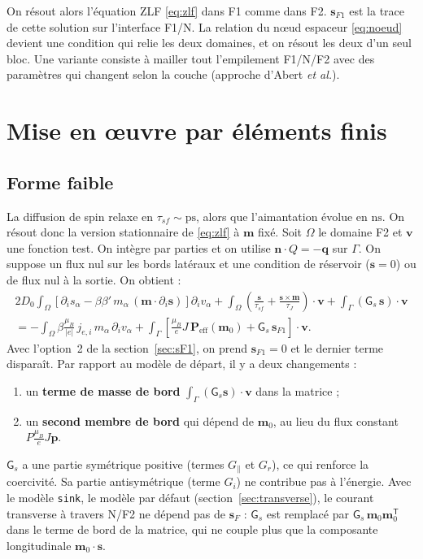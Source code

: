 \documentclass[11pt,a4paper]{article}
\newcommand{\vm}{\bm{m}}
\newcommand{\vp}{\bm{p}}
\newcommand{\vs}{\bm{s}}
\newcommand{\vv}{\bm{v}}
\newcommand{\vq}{\bm{q}}
\newcommand{\mG}{\mathsf{G}}
\begin{document}
On résout alors l'équation ZLF \eqref{eq:zlf} dans F1 comme dans F2.
$\vs_{F1}$ est la trace de cette solution sur l'interface F1/N. La relation
du nœud espaceur \eqref{eq:noeud} devient une condition qui relie les deux
domaines, et on résout les deux d'un seul bloc. Une variante consiste à
mailler tout l'empilement F1/N/F2 avec des paramètres qui changent selon la
couche (approche d'Abert \emph{et al.}).

\section{Mise en œuvre par éléments finis}

\subsection{Forme faible}

La diffusion de spin relaxe en $\tau_{sf}\sim\mathrm{ps}$, alors que
l'aimantation évolue en $\mathrm{ns}$. On résout donc la version
stationnaire de \eqref{eq:zlf} à $\vm$ fixé. Soit $\Omega$ le domaine F2
et $\vv$ une fonction test. On intègre par parties et on utilise
$\bm{n}\cdot Q = -\vq$ sur $\Gamma$. On suppose un flux nul sur
les bords latéraux et une condition de réservoir ($\vs=0$) ou de flux nul
à la sortie. On obtient :
\begin{multline}
  2D_0\int_\Omega\left[\partial_i s_\alpha
    - \beta\beta'\,m_\alpha\,(\vm\cdot\partial_i\vs)\right]\partial_i v_\alpha
  + \int_\Omega\left(\frac{\vs}{\tau_{sf}}
    + \frac{\vs\times\vm}{\tau_J}\right)\cdot\vv
  + \int_\Gamma\left(\mG_s\,\vs\right)\cdot\vv
  \\
  = -\int_\Omega\beta\frac{\mu_B}{|e|}\,j_{e,i}\,m_\alpha\,\partial_i v_\alpha
  + \int_\Gamma\left[\frac{\mu_B}{e}J\,\bm{P}_{\!\mathrm{eff}}(\vm_0)
    + \mG_s\,\vs_{F1}\right]\cdot\vv.
  \label{eq:faible}
\end{multline}
Avec l'option~2 de la section~\ref{sec:sF1}, on prend $\vs_{F1}=0$ et
le dernier terme disparaît. Par rapport au modèle de départ, il y a deux
changements :
\begin{enumerate}
  \item un \textbf{terme de masse de bord}
    $\int_\Gamma(\mG_s\vs)\cdot\vv$ dans la matrice ;
  \item un \textbf{second membre de bord} qui dépend de $\vm_0$, au lieu
    du flux constant $P\frac{\mu_B}{e}J\vp$.
\end{enumerate}
$\mG_s$ a une partie symétrique positive (termes $G_\parallel$ et $G_r$),
ce qui renforce la coercivité. Sa partie antisymétrique (terme $G_i$) ne
contribue pas à l'énergie. Avec le modèle \texttt{sink}, le modèle par
défaut (section~\ref{sec:transverse}), le courant transverse à travers N/F2
ne dépend pas de $\vs_F$ : $\mG_s$ est remplacé par
$\mG_s\,\vm_0\vm_0^{\mathsf{T}}$ dans le terme de bord de la matrice, qui
ne couple plus que la composante longitudinale $\vm_0\cdot\vs$.
\end{document}
